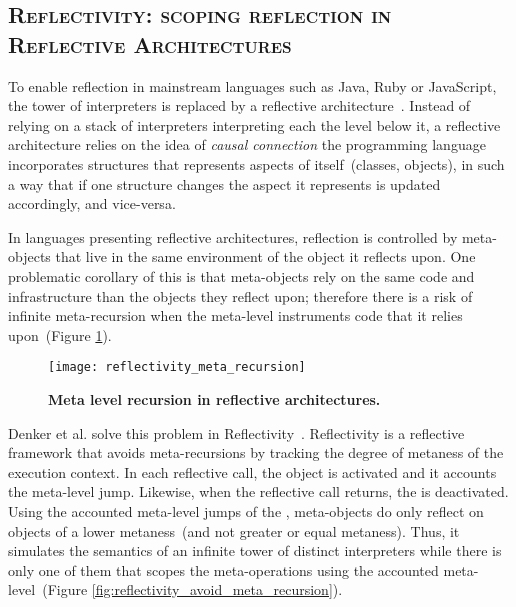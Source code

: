 \subsection*{\textsc{Reflectivity: scoping reflection in Reflective Architectures}}

To enable reflection in mainstream languages such as Java, Ruby or JavaScript, the tower of interpreters is replaced by a reflective architecture~\cite{Maes87a}. Instead of relying on a stack of interpreters interpreting each the level below it, a reflective architecture relies on the idea of \emph{causal connection} \ie the programming language incorporates structures that represents aspects of itself~(\eg classes, objects), in such a way that if one structure changes the aspect it represents is updated accordingly, and vice-versa.


In languages presenting reflective architectures, reflection is controlled by meta-objects that live in the same environment of the object it reflects upon.
One problematic corollary of this is that meta-objects rely on the same code and infrastructure than the objects they reflect upon; therefore there is a risk of infinite meta-recursion when the meta-level instruments code that it relies upon~(Figure \ref{fig:reflectivity_meta_recursion}).

\begin{figure}[ht]
\begin{center}
\texttt{[image: reflectivity\_meta\_recursion]}
\caption{\textbf{Meta level recursion in reflective architectures.}\label{fig:reflectivity_meta_recursion}
 }
\end{center}
\end{figure}

Denker et al. solve this problem in Reflectivity~\cite{Denk08b}. Reflectivity is a reflective framework that avoids meta-recursions by tracking the degree of metaness of the execution context. In each reflective call, the  object is activated and it accounts the meta-level jump. Likewise, when the reflective call returns, the  is deactivated. Using the accounted meta-level jumps of the , meta-objects do only reflect on objects of a lower metaness~(and not greater or equal metaness). Thus, it simulates the semantics of an infinite tower of distinct interpreters while there is only one of them that scopes the meta-operations using the accounted meta-level~(Figure \ref{fig:reflectivity_avoid_meta_recursion}).

